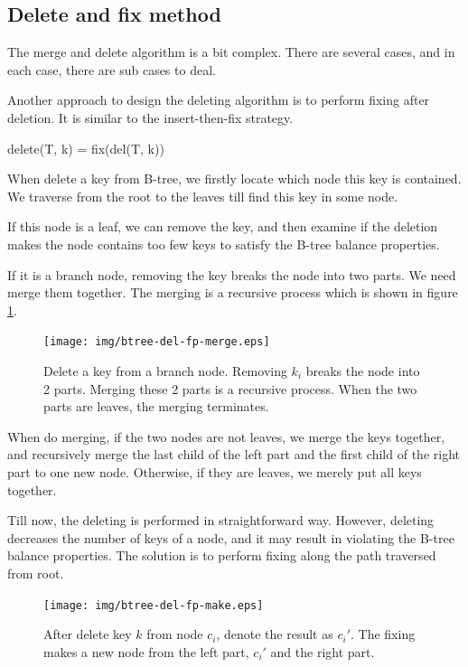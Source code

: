 \documentclass[b5paper]{article}
\begin{document}
\subsection{Delete and fix method}

The merge and delete algorithm is a bit complex.
There are several cases, and in each case, there are sub cases to deal.

Another approach to design the deleting algorithm is to perform fixing
after deletion. It is similar to the insert-then-fix strategy.

\be
delete(T, k) = fix(del(T, k))
\ee

When delete a key from B-tree, we firstly locate
which node this key is contained. We traverse
from the root to the leaves till find this key in some node.

If this node is a leaf, we can remove the key, and then
examine if the deletion makes the node contains too few keys to
satisfy the B-tree balance properties.

If it is a branch node, removing the key breaks the node into
two parts. We need merge them together. The merging is a recursive
process which is shown in figure \ref{fig:del-fp-merge}.

\begin{figure}[htbp]
  \centering
  \texttt{[image: img/btree-del-fp-merge.eps]}
  \caption{Delete a key from a branch node. Removing $k_i$ breaks
the node into 2 parts. Merging these 2 parts
is a recursive process. When the two parts are leaves, the merging
terminates.} \label{fig:del-fp-merge}
\end{figure}

When do merging, if the two nodes are not leaves, we merge the keys
together, and recursively merge the last child of the left part
and the first child of the right part to one new node. Otherwise,
if they are leaves, we merely put all keys together.

Till now, the deleting is performed in straightforward way. However, deleting
decreases the number of keys of a node, and it may result in
violating the B-tree balance properties. The solution is to perform
fixing along the path traversed from root.

\begin{figure}[htbp]
  \centering
  \texttt{[image: img/btree-del-fp-make.eps]}
  \caption{After delete key $k$ from node $c_i$, denote the result
as $c_i'$. The fixing makes a new node from the
left part, $c_i'$ and the right part.}
  \label{fig:del-fp-make}
\end{figure}
\end{document}
